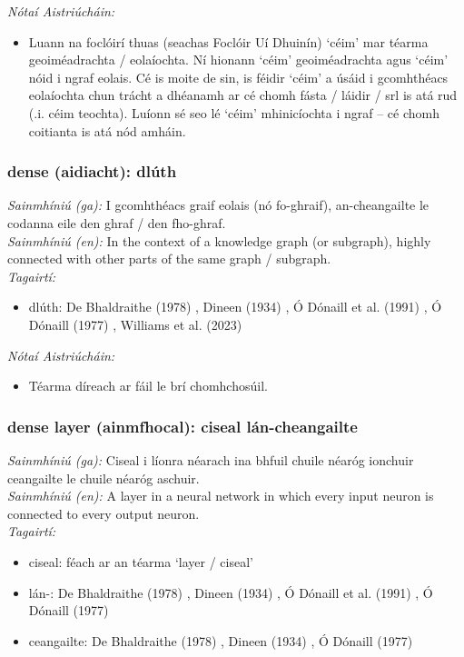  \noindent \textit{Nótaí Aistriúcháin:}
\begin{itemize}
	\item Luann na foclóirí thuas (seachas Foclóir Uí Dhuinín) `céim' mar téarma geoiméadrachta / eolaíochta. Ní hionann `céim' geoiméadrachta agus `céim' nóid i ngraf eolais. Cé is moite de sin, is féidir `céim' a úsáid i gcomhthéacs eolaíochta chun trácht a dhéanamh ar cé chomh fásta / láidir / srl is atá rud (.i. céim teochta). Luíonn sé seo lé `céim' mhinicíochta i ngraf -- cé chomh coitianta is atá nód amháin.
\end{itemize}


\subsubsection*{dense (aidiacht): dlúth}
 \noindent \textit{Sainmhíniú (ga):} I gcomhthéacs graif eolais (nó fo-ghraif), an-cheangailte le codanna eile den ghraf / den fho-ghraf.
\\
 \noindent \textit{Sainmhíniú (en):} In the context of a knowledge graph (or subgraph), highly connected with other parts of the same graph / subgraph.
\\
 \noindent \textit{Tagairtí:}
\begin{itemize}
	\item dlúth: De Bhaldraithe (1978) \cite{de-bhaldraithe}, Dineen (1934) \cite{dineen}, Ó Dónaill et al. (1991) \cite{focloir-beag}, Ó Dónaill (1977) \cite{odonaill}, Williams et al. (2023) \cite{storchiste}
\end{itemize}

 \noindent \textit{Nótaí Aistriúcháin:}
\begin{itemize}
	\item Téarma díreach ar fáil le brí chomhchosúil.
\end{itemize}


\subsubsection*{dense layer (ainmfhocal): ciseal lán-cheangailte}
 \noindent \textit{Sainmhíniú (ga):} Ciseal i líonra néarach ina bhfuil chuile néaróg ionchuir ceangailte le chuile néaróg aschuir.
\\
 \noindent \textit{Sainmhíniú (en):} A layer in a neural network in which every input neuron is connected to every output neuron.
\\
 \noindent \textit{Tagairtí:}
\begin{itemize}
	\item ciseal: féach ar an téarma `layer / ciseal'
	\item lán-: De Bhaldraithe (1978) \cite{de-bhaldraithe}, Dineen (1934) \cite{dineen}, Ó Dónaill et al. (1991) \cite{focloir-beag}, Ó Dónaill (1977) \cite{odonaill}
	\item ceangailte: De Bhaldraithe (1978) \cite{de-bhaldraithe}, Dineen (1934) \cite{dineen}, Ó Dónaill (1977) \cite{odonaill}
\end{itemize}

